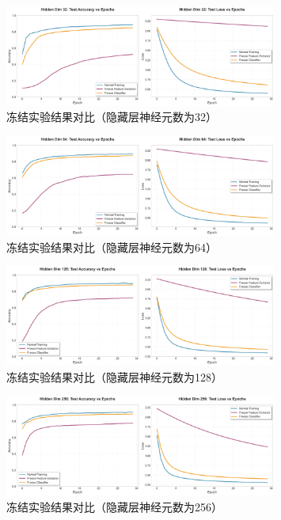 \begin{figure}[H]
    \centering
    \includegraphics[width=0.8\textwidth]{../images/dd/hidden_32_comparison.png}
    \caption{冻结实验结果对比（隐藏层神经元数为32）}
    \label{fig:hidden_32_comparison.png}
\end{figure}
\begin{figure}[H]
    \centering
    \includegraphics[width=0.8\textwidth]{../images/dd/hidden_64_comparison.png}
    \caption{冻结实验结果对比（隐藏层神经元数为64）}
    \label{fig:hidden_64_comparison.png}
\end{figure}
\begin{figure}[H]
    \centering
    \includegraphics[width=0.8\textwidth]{../images/dd/hidden_128_comparison.png}
    \caption{冻结实验结果对比（隐藏层神经元数为128）}
    \label{fig:hidden_128_comparison.png}
\end{figure}
\begin{figure}[H]
    \centering
    \includegraphics[width=0.8\textwidth]{../images/dd/hidden_256_comparison.png}
    \caption{冻结实验结果对比（隐藏层神经元数为256）}
    \label{fig:hidden_256_comparison.png}
\end{figure}


